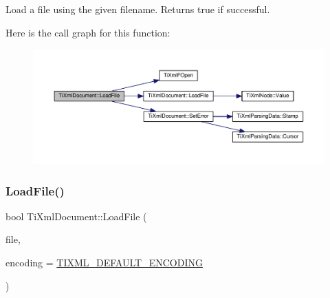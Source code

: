 Load a file using the given filename. Returns true if successful. 

Here is the call graph for this function\+:
\nopagebreak
\begin{figure}[H]
\begin{center}
\leavevmode
\includegraphics[width=350pt]{class_ti_xml_document_a879cdf5e981b8b2d2ef82f2546dd28fb_cgraph}
\end{center}
\end{figure}
\mbox{\label{class_ti_xml_document_a41f6fe7200864d1dca663d230caf8db6}} 
\subsubsection{\texorpdfstring{Load\+File()}{LoadFile()}\hspace{0.1cm}{\footnotesize\ttfamily [3/3]}}
{\footnotesize\ttfamily bool Ti\+Xml\+Document\+::\+Load\+File (\begin{DoxyParamCaption}\item[{F\+I\+LE $\ast$}]{file,  }\item[{\hyperlink{tinyxml_8h_a88d51847a13ee0f4b4d320d03d2c4d96}{Ti\+Xml\+Encoding}}]{encoding = {\ttfamily \hyperlink{tinyxml_8h_ad5b8b092878e9010d6400cb6c13d4879}{T\+I\+X\+M\+L\+\_\+\+D\+E\+F\+A\+U\+L\+T\+\_\+\+E\+N\+C\+O\+D\+I\+NG}} }\end{DoxyParamCaption})}

